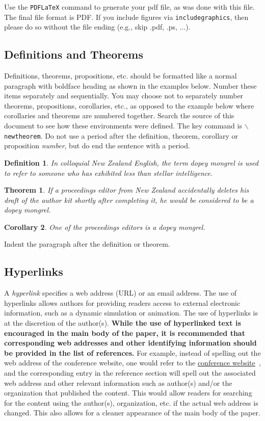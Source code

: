 \documentclass{wscpaperproc}
\theoremstyle{wsc}
\newtheorem{theorem}{Theorem}
\newtheorem{corollary}[theorem]{Corollary}
\newtheorem{definition}{Definition}
\begin{document}
Use the {\tt PDFLaTeX} command to generate your pdf file, as was done with this file.
The final file format is PDF.
If you include figures via {\tt includegraphics}, then please do so without the file ending (e.g., skip .pdf, .ps, ...).

\subsection{Definitions and Theorems}
Definitions, theorems, propositions, etc. should be formatted like a normal paragraph with boldface heading as shown in the examples below. Number
these items separately and sequentially. You may choose not to separately number theorems, propositions, corollaries, etc., as opposed to the example below where corollaries and theorems are numbered together. Search the source of this document to see how these environments were defined. The key
command is {\tt $\backslash$newtheorem}. Do not use a period after the definition, theorem, corollary or proposition \textit{number}, but do end the sentence with a period.

\begin{definition}
In colloquial New Zealand English, the term {\em dopey mongrel} is used to refer to someone who has exhibited less than stellar intelligence.
\end{definition}

\begin{theorem}
If a proceedings editor from New Zealand accidentally deletes his draft of the author kit shortly after completing it, he would be considered to be a dopey mongrel.
\end{theorem}

\begin{corollary}
One of the proceedings editors is a dopey mongrel.
\end{corollary}

Indent the paragraph after the definition or theorem.

\subsection{Hyperlinks}
\label{sec: hyper}
A {\em hyperlink} specifies a web address (URL) or an email address.
The use of hyperlinks allows authors for providing readers access to external electronic information, such as a dynamic simulation or animation.
The use of hyperlinks is at the discretion of the author(s).
{\bf While the use of hyperlinked text is encouraged in the main body of the paper, it is recommended that corresponding web addresses and other identifying information should be provided in the list of references.}
For example, instead of spelling out the web address of the conference website, one would refer to the \href{http://www.wintersim.org}{conference website}~\cite{WSC}, and the corresponding entry in the reference section will spell out the associated web address and other relevant information such as author(s) and/or the organization that published the content.
This would allow readers for searching for the content using the author(s), organization, etc. if the actual web address is changed. This also allows for a cleaner appearance of the main body of the paper.
\end{document}
